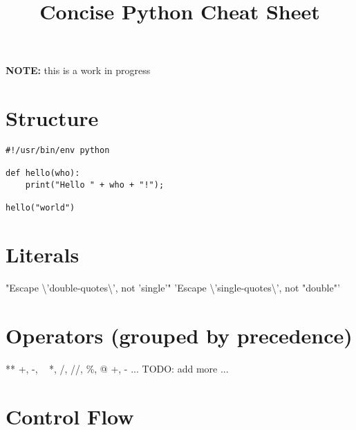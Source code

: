 \documentclass{refcard}
\title{Concise Python Cheat Sheet}
\begin{document}
\maketitle

\vspace{4em}
\begin{center}
{\Large\textbf{NOTE:} this is a work in progress}
\end{center}
\vspace{4em}

\section{Structure}

\begin{verbatim}
#!/usr/bin/env python

def hello(who):
    print("Hello " + who + "!");

hello("world")
\end{verbatim}



\section{Literals}

\begin{ldesc}
	    "Escape \textbackslash{}'double-quotes\textbackslash{}', not 'single'"
	    'Escape \textbackslash{}'single-quotes\textbackslash{}', not "double"'
\end{ldesc}


\section{Operators (grouped by precedence)}

\begin{Ldesc}
	\Li[exponentiation]                  **
	 +, -, ~
	     *, /, //, \%, @
	        +, -
	\Li[...] ... TODO: add more ...
\end{Ldesc}


\section{Control Flow}
\end{document}
